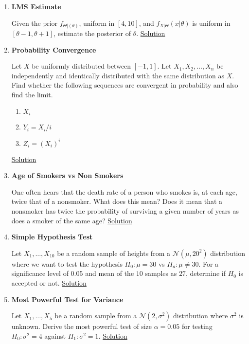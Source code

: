 \documentclass[../probability-notes.tex]{subfiles}
\begin{document}
\begin{enumerate}
    \item \hypertarget{q_lmsestimate}{\textbf{LMS Estimate}}\newline
    Given the prior $f_{\Theta|(\theta)}$, uniform in $[4,10]$, and $f_{X|\Theta}(x|\theta)$ is uniform in $[\theta-1, \theta+1]$, estimate the posterior of $\theta$. \hyperlink{a_lmsestimate}{Solution}


    \item \hypertarget{q_convergence}{\textbf{Probability Convergence}}\newline
    Let $X$ be uniformly distributed between $[-1,1]$. Let $X_{1}, X_{2},\ldots,X_{n}$ be independently and identically distributed with the same distribution as $X$. Find whether the following sequences are convergent in probability and also find the limit.
    \begin{enumerate}
        \item $X_{i}$
        \item $Y_{i} = X_{i}/i$
        \item $Z_{i} = (X_{i})^{i}$
    \end{enumerate}
    \hyperlink{a_convergence}{Solution}


    \item \hypertarget{q_lifesmoker}{\textbf{Age of Smokers vs Non Smokers}}\newline
    One often hears that the death rate of a person who smokes is, at each age, twice that of a nonsmoker. What does this mean? Does it mean that a nonsmoker has twice the probability of surviving a given number of years as does a smoker of the same age? \hyperlink{a_lifesmoker}{Solution}

    \item \hypertarget{q_hypothesis_test}{\textbf{Simple Hypothesis Test}}\newline
    Let $X_{1}, \ldots, X_{10}$ be a random sample of heights from a $\mathcal{N}(\mu, 20^{2})$ distribution where we want to test the hypothesis $H_{0}: \mu = 30$ vs $H_{a}: \mu \neq 30$. For a significance level of $0.05$ and mean of the $10$ samples as $27$, determine if $H_{0}$ is accepted or not. \hyperlink{a_hypothesis_test}{Solution}

    \item \hypertarget{q_most_powerful_test}{\textbf{Most Powerful Test for Variance}}\newline
    Let $X_{1}, \ldots, X_{5}$ be a random sample from a $\mathcal{N}(2, \sigma^{2})$ distribution where $\sigma^{2}$ is unknown. Derive the most powerful test  of size $\alpha = 0.05$ for testing $H_{0}: \sigma^{2} = 4$ against $H_{1}: \sigma^{2} = 1$. \hyperlink{a_most_powerful_test}{Solution}

    \end{enumerate}
\end{document}
